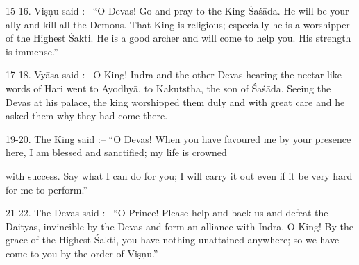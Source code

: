 15-16. Vi\d{s}\d{n}u said :-- ``O Devas! Go and pray to the King \'Sa\'s\=ada. He will be your ally and kill all the Demons. That King is religious; especially he is a worshipper of the Highest \'Sakti. He is a good archer and will come to help you. His strength is immense.''

17-18. Vy\=asa said :-- O King! Indra and the other Devas hearing the nectar like words of Hari went to Ayodhy\=a, to Kakutstha, the son of \'Sa\'s\=ada. Seeing the Devas at his palace, the king worshipped them duly and with great care and he asked them why they had come there.

19-20. The King said :-- ``O Devas! When you have favoured me by your presence here, I am blessed and sanctified; my life is crowned

with success. Say what I can do for you; I will carry it out even if it be very hard for me to perform.''

21-22. The Devas said :-- ``O Prince! Please help and back us and defeat the Daityas, invincible by the Devas and form an alliance with Indra. O King! By the grace of the Highest \'Sakti, you have nothing unattained anywhere; so we have come to you by the order of Vi\d{s}\d{n}u.''

